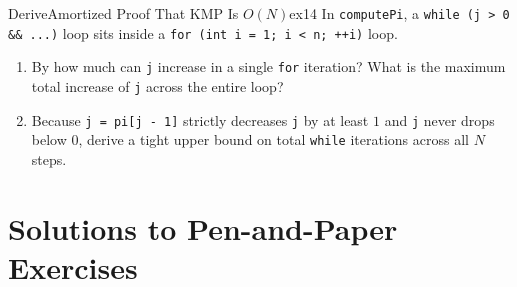 \documentclass[11pt,a4paper]{article}
\theoremstyle{definition}
\begin{document}
\begin{tryitbox}{Derive}{Amortized Proof That KMP Is $O(N)$}{ex14}
In \texttt{computePi}, a \texttt{while (j > 0 \&\& ...)} loop sits inside a \texttt{for (int i = 1; i < n; ++i)} loop.
\begin{enumerate}
    \item By how much can \texttt{j} increase in a single \texttt{for} iteration? What is the maximum total increase of \texttt{j} across the entire loop?
    \item Because \texttt{j = pi[j - 1]} strictly decreases \texttt{j} by at least $1$ and \texttt{j} never drops below $0$, derive a tight upper bound on total \texttt{while} iterations across all $N$ steps.
\end{enumerate}
\end{tryitbox}

\section*{Solutions to Pen-and-Paper Exercises}
\end{document}
